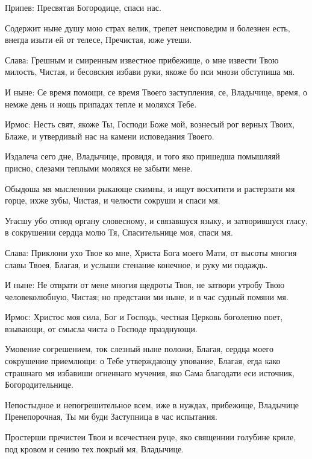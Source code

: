 Припев: Пресвятая Богородице, спаси нас.


Содержит ныне душу мою страх велик, трепет неисповедим и болезнен есть, внегда изыти ей от телесе, Пречистая, юже утеши.


Слава: Грешным и смиренным известное прибежище, о мне извести Твою милость, Чистая, и бесовския избави руки, якоже бо пси мнози обступиша мя.


И ныне: Се время помощи, се время Твоего заступления, се, Владычице, время, о немже день и нощь припадах тепле и моляхся Тебе.




Ирмос: Несть свят, якоже Ты, Господи Боже мой, вознесый рог верных Твоих, Блаже, и утвердивый нас на камени исповедания Твоего.


\medskip


Издалеча сего дне, Владычице, провидя, и того яко пришедша помышляяй присно, слезами теплыми моляхся не забыти мене.


Обыдоша мя мысленнии рыкающе скимны, и ищут восхитити и растерзати мя горце, ихже зубы, Чистая, и челюсти сокруши и спаси мя.


Угасшу убо отнюд органу словесному, и связавшуся языку, и затворившуся гласу, в сокрушении сердца молю Тя, Спасительнице моя, спаси мя.


Слава: Приклони ухо Твое ко мне, Христа Бога моего Мати, от высоты многия славы Твоея, Благая, и услыши стенание конечное, и руку ми подаждь.


И ныне: Не отврати от мене многия щедроты Твоя, не затвори утробу Твою человеколюбную, Чистая; но предстани ми ныне, и в час судный помяни мя.




Ирмос: Христос моя сила, Бог и Господь, честная Церковь боголепно поет, взывающи, от смысла чиста о Господе празднующи.


\medskip


Умовение согрешением, ток слезный ныне положи, Благая, сердца моего сокрушение приемлющи: о Тебе утверждающу упование, Благая, егда како страшнаго мя избавиши огненнаго мучения, яко Сама благодати еси источник, Богородительнице.


Непостыдное и непогрешительное всем, иже в нуждах, прибежище, Владычице Пренепорочная, Ты ми буди Заступница в час испытания.


Простерши пречистеи Твои и всечестнеи руце, яко священнии голубине криле, под кровом и сению тех покрый мя, Владычице.


